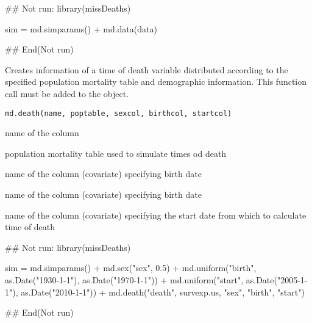 \documentclass[a4paper]{book}
\begin{document}
%
\begin{Examples}
\begin{ExampleCode}

## Not run: 
library(missDeaths)

sim = md.simparams() +
   md.data(data) 

## End(Not run)
\end{ExampleCode}
\end{Examples}
%
\begin{Description}\relax
Creates information of a time of death variable distributed according to the specified population mortality table and demographic information.
This function call must be added to the  object.
\end{Description}
%
\begin{Usage}
\begin{verbatim}
md.death(name, poptable, sexcol, birthcol, startcol)
\end{verbatim}
\end{Usage}
%
\begin{Arguments}
\begin{ldescription}
\item[\code{name}] name of the column

\item[\code{poptable}] population mortality table used to simulate times od death

\item[\code{sexcol}] name of the column (covariate) specifying birth date

\item[\code{birthcol}] name of the column (covariate) specifying birth date

\item[\code{startcol}] name of the column (covariate) specifying the start date from which to calculate time of death
\end{ldescription}
\end{Arguments}
%
\begin{Examples}
\begin{ExampleCode}

## Not run: 
library(missDeaths)

sim = md.simparams() +
   md.sex("sex", 0.5) + 
     md.uniform("birth", as.Date("1930-1-1"), as.Date("1970-1-1")) +
       md.uniform("start", as.Date("2005-1-1"), as.Date("2010-1-1")) +
         md.death("death", survexp.us, "sex", "birth", "start") 

## End(Not run)
\end{ExampleCode}
\end{Examples}
\end{document}

